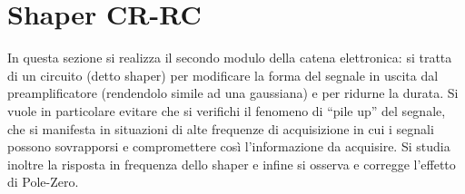 
\section{Shaper CR-RC}\label{sec:shaper}
In questa sezione si realizza il secondo modulo della catena elettronica: si tratta di un circuito (detto shaper) per modificare la forma del
segnale in uscita dal preamplificatore (rendendolo simile ad una gaussiana) e
per ridurne la durata. Si vuole in particolare evitare che si verifichi il fenomeno di ``pile up'' del segnale, che si manifesta in situazioni di alte
frequenze di acquisizione in cui i segnali possono sovrapporsi e compromettere così l'informazione da acquisire.
Si studia inoltre la risposta in frequenza dello shaper e infine si
osserva e corregge l'effetto di Pole-Zero.


